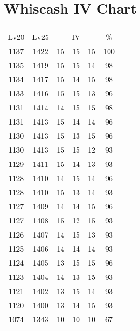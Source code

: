 \documentclass{article}%
\begin{document}
%
\normalsize%
\section{Whiscash IV Chart}%
\label{sec:Whiscash IV Chart}%
\renewcommand{\arraystretch}{1.5}%
\begin{tabular}{|c|c|c|c|c|c|}%
\hline%
\multicolumn{6}{|c|}{\textcolor{white}{ 
\linebreak{Whiscash}
}%
\cellcolor{black}}\\%
\multicolumn{1}{|c}{Lv20}&\multicolumn{1}{c|}{Lv25}&\multicolumn{3}{c|}{IV}&\multicolumn{1}{|c|}{\%}\\%
\hline%
\rowcolor{color100}%
1137&1422&15&15&15&100\\%
\hline%
\rowcolor{color98}%
1135&1419&15&15&14&98\\%
\hline%
\rowcolor{color98}%
1134&1417&15&14&15&98\\%
\hline%
\rowcolor{color96}%
1133&1416&15&15&13&96\\%
\hline%
\rowcolor{color98}%
1131&1414&14&15&15&98\\%
\hline%
\rowcolor{color96}%
1131&1413&15&14&14&96\\%
\hline%
\rowcolor{color96}%
1130&1413&15&13&15&96\\%
\hline%
\rowcolor{color93}%
1130&1413&15&15&12&93\\%
\hline%
\rowcolor{color93}%
1129&1411&15&14&13&93\\%
\hline%
\rowcolor{color96}%
1128&1410&14&15&14&96\\%
\hline%
\rowcolor{color93}%
1128&1410&15&13&14&93\\%
\hline%
\rowcolor{color96}%
1127&1409&14&14&15&96\\%
\hline%
\rowcolor{color93}%
1127&1408&15&12&15&93\\%
\hline%
\rowcolor{color93}%
1126&1407&14&15&13&93\\%
\hline%
\rowcolor{color93}%
1125&1406&14&14&14&93\\%
\hline%
\rowcolor{color96}%
1124&1405&13&15&15&96\\%
\hline%
\rowcolor{color93}%
1123&1404&14&13&15&93\\%
\hline%
\rowcolor{color93}%
1121&1402&13&15&14&93\\%
\hline%
\rowcolor{color93}%
1120&1400&13&14&15&93\\%
\hline%
\rowcolor{color91}%
1074&1343&10&10&10&67\\%
\end{tabular}

%
\end{document}
